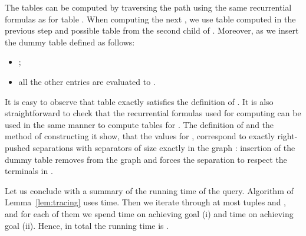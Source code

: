 \documentclass[a4paper,11pt]{article}
\theoremstyle{definition}
\theoremstyle{remark}
\begin{document}
The tables  can be computed by traversing the path  using the
same recurrential formulas as for table .  When computing the
next , we use table  computed in the previous step
and possible table  from the second child of .  Moreover, as
 we insert the dummy table  defined as follows:
\begin{itemize}
\item ;
\item all the other entries are evaluated to .
\end{itemize}
It is easy to observe that table  exactly satisfies the
definition of .  It is also straightforward to check that the
recurrential formulas used for computing  can be used in the same
manner to compute tables  for .  The
definition of  and the method of constructing it show, that the
values
 for
, correspond to exactly right-pushed separations with
separators of size exactly  in the graph : insertion of the
dummy table removes  from the graph and forces the separation to
respect the terminals in .

Let us conclude with a summary of the running time of the query.
Algorithm of Lemma~\ref{lem:tracing} uses 
time.  Then we iterate through at most  tuples
 and , and for each of them we spend 
time on achieving goal (i) and  time
on achieving goal (ii).  Hence, in total the running time is
.
\end{document}
